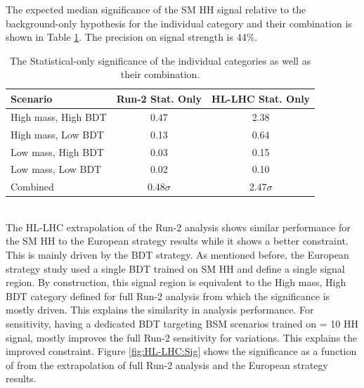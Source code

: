 The expected median significance of the SM HH signal relative to the background-only hypothesis for the individual category and their combination is shown in Table \ref{tab:HL-LHC:Sig}. The precision on signal strength is 44\%.

\begin{table}[htbp]
    \centering
    \begin{tabular}{lcc}
    \hline\hline 
        Scenario & Run-2 Stat. Only & HL-LHC Stat. Only \\
    \hline    
        High mass, High BDT & 0.47 & 2.38 \\
        High mass, Low BDT  & 0.13 & 0.64 \\
        Low mass, High BDT  & 0.03 & 0.15 \\
        Low mass, Low BDT   & 0.02 & 0.10 \\
        \hline
        Combined & 0.48$\sigma$ & 2.47$\sigma$ \\
    \hline\hline 
    \end{tabular}
    \begin{tcolorbox}[colback=black!5!white, colframe=white!75!black]
    \caption{The Statistical-only significance of the individual categories as well as their combination.}
    \label{tab:HL-LHC:Sig}
    \end{tcolorbox}
\end{table}
\\
The HL-LHC extrapolation of the Run-2 analysis shows similar performance for the SM HH to the European strategy results while it shows a better \kl constraint. This is mainly driven by the BDT strategy. As mentioned before, the European strategy study used a single BDT trained on SM HH and define a single signal region. By construction, this signal region is equivalent to the High mass, High BDT category defined for full Run-2 analysis from which the significance is mostly driven. This explains the similarity in analysis performance. For \kl sensitivity, having a dedicated BDT targeting BSM scenarios trained on \kl = 10 HH signal, mostly improves the full Run-2 sensitivity for \kl variations. This explains the improved \kl constraint. Figure \ref{fig:HL-LHC:Sig} shows the significance as a function of \kl from the extrapolation of full Run-2 analysis and the European strategy results. \\

